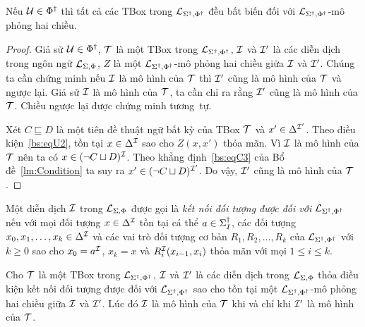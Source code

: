 \begin{Corollary}
	\label{co:TBoxInvariant}
	Nếu $\mathcal{U} \in \Phi^\dag$ thì tất cả các TBox trong $\mathcal{L}_{\Sigma^\dag,\Phi^\dag}$ đều bất biến đối với $\mathcal{L}_{\Sigma^\dag,\Phi^\dag}$-mô phỏng hai chiều.
\end{Corollary}

\begin{proof}
	Giả sử $\mathcal{U} \in \Phi^\dag$, $\mathcal{T}$ là một TBox trong $\mathcal{L}_{\Sigma^\dag,\Phi^\dag}$, $\mathcal{I}$ và $\mathcal{I}'$ là các diễn dịch trong ngôn ngữ $\mathcal{L}_{\Sigma,\Phi}$, $Z$ là một $\mathcal{L}_{\Sigma^\dag,\Phi^\dag}$-mô phỏng hai chiều giữa $\mathcal{I}$ và $\mathcal{I}'$. Chúng ta cần chứng minh nếu $\mathcal{I}$ là mô hình của $\mathcal{T}$ thì $\mathcal{I}'$ cũng là mô hình của $\mathcal{T}$ và ngược lại. Giả sử $\mathcal{I}$ là mô hình của $\mathcal{T}$, ta cần chỉ ra rằng $\mathcal{I}'$ cũng là mô hình của $\mathcal{T}$. Chiều ngược lại được chứng minh tương~tự.
	
	Xét $C \sqsubseteq D$ là một tiên đề thuật ngữ bất kỳ của TBox $\mathcal{T}$ và $x' \in \Delta^{\mathcal{I}'}$. Theo điều kiện~\eqref{bs:eqU2}, tồn tại $x \in \Delta^{\mathcal{I}}$ sao cho $Z(x, x')$ thỏa mãn. Vì $\mathcal{I}$ là mô hình của $\mathcal{T}$ nên ta có $x \in (\neg C \sqcup D)^{\mathcal{I}}$. Theo khẳng định~\eqref{bs:eqC3} của Bổ đề~\ref{lm:Condition} ta suy ra $x' \in (\neg C \sqcup D)^{\mathcal{I}'}$. Do vậy, $\mathcal{I}'$ cũng là mô hình của $\mathcal{T}$.
\end{proof}

Một diễn dịch $\mathcal{I}$ trong $\mathcal{L}_{\Sigma,\Phi}$ được gọi là {\em kết nối đối tượng được đối với $\mathcal{L}_{\Sigma^\dag,\Phi^\dag}$} nếu với mọi đối tượng $x \in \Delta^{\mathcal{I}}$ tồn tại cá thể $a \in \Sigma^\dag_I$, các đối tượng $x_0, x_1, \ldots, x_k \in \Delta^{\mathcal{I}}$ và các vai trò đối tượng cơ bản $R_1, R_2, \ldots, R_k$ của $\mathcal{L}_{\Sigma^\dag,\Phi^\dag}$ với $k \geq 0$ sao cho $x_0 = a^{\mathcal{I}}$, $x_k = x$ và $R_i^{\mathcal{I}}(x_{i-1}, x_i)$ thỏa mãn với mọi $1 \leq i \leq k$.

\begin{Theorem}
\label{th:TBoxInvariant}
	Cho $\mathcal{T}$ là một TBox trong $\mathcal{L}_{\Sigma^\dag,\Phi^\dag}$, $\mathcal{I}$ và $\mathcal{I}'$ là các diễn dịch trong $\mathcal{L}_{\Sigma,\Phi}$ thỏa điều kiện kết nối đối tượng được đối với $\mathcal{L}_{\Sigma^\dag,\Phi^\dag}$ sao cho tồn tại một $\mathcal{L}_{\Sigma^\dag,\Phi^\dag}$-mô phỏng hai chiều giữa $\mathcal{I}$ và $\mathcal{I}'$. Lúc đó $\mathcal{I}$ là mô hình của $\mathcal{T}$ khi và chỉ khi $\mathcal{I}'$ là mô hình của $\mathcal{T}$.
\end{Theorem}

